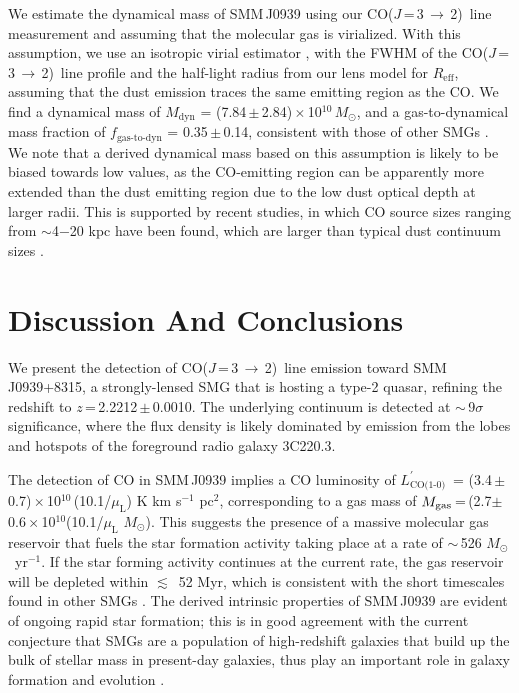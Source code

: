 \documentclass[iop, revtex4]{emulateapj}
\newcommand{\Msun}{\mbox{$M_{\odot}$}}
\newcommand{\CO}{\mbox{CO($J$\,=\,3\,$\rightarrow$\,2) }}
\newcommand{\Lp}{\mbox{$L^{\prime}_\textrm{CO(1-0)}$}}
\newcommand{\LpU}{\mbox{K\,\,km\,\,s$^{-1}$\,\,pc$^2$}}
\newcommand{\eg}{{\sl e.g.,~}}
\newcommand{\pmOne}{\mbox{$^{-1}$}}
\begin{document}
We estimate the dynamical mass of SMM\,J0939 using our \CO line measurement and assuming that the molecular gas is virialized. With this assumption, we use an isotropic virial estimator \citep[\eg][]{Engel10a}, with the FWHM of the \CO line profile and the half-light radius from our lens model for $R_\textrm{eff}$, assuming that the dust emission traces the same emitting region as the CO.
We find a dynamical mass of $M_\textrm{dyn}$ = (7.84\,$\pm$\,2.84)\,$\times$\,10$^{10}$\,\Msun, and a gas-to-dynamical mass fraction of $f_\textrm{gas-to-dyn}$ = 0.35\,$\pm$\,0.14, consistent with those of other SMGs \citep{Tacconi06a}.  We note that a derived dynamical mass based on this assumption is likely to be biased towards low values, as the CO-emitting region can be apparently more extended than the dust emitting region
 due to the low dust optical depth at larger radii.
This is supported by recent studies, in which CO source sizes ranging from $\sim$4$-$20 kpc have been found, which are larger than typical dust continuum sizes \citep{Tacconi06a, Riechers11c, Ivison11a, Hodge13a, Hodge15a}.

\section{Discussion And Conclusions}
We present the detection of \CO line emission toward SMM\,J0939+8315, a strongly-lensed SMG that is hosting a type-2 quasar, refining the redshift
to $z$\,=\,2.2212\,$\pm$\,0.0010. The underlying continuum is detected at $\sim$\,9$\sigma$ significance, where the flux density is likely dominated by emission from the lobes and hotspots of the foreground radio galaxy 3C220.3.

The detection of CO in SMM\,J0939
implies a CO luminosity of \Lp\ = (3.4\,$\pm$\,0.7)\,$\times$\,10$^{10}$\,(10.1/$\mu_\textrm{L}$) \LpU, corresponding to a gas mass of
$M_{\rm gas}$\,=\,(2.7$\pm$0.6\,$\times$\,10$^{10}$(10.1/$\mu_\textrm{L}$ $\Msun$).
This 
suggests the presence of a massive
molecular gas reservoir that fuels the star formation activity taking place at a rate of $\sim$\,526 \Msun~yr\pmOne. If the star forming activity continues at the current rate, the gas reservoir will be depleted within $\lesssim$~52 Myr,
which is consistent with the short timescales found in other SMGs \citep{Greve05a}. The derived intrinsic properties of SMM\,J0939 are evident of ongoing rapid star formation; this is in good agreement with the current conjecture that SMGs are a
population of high-redshift galaxies that build up the bulk of stellar mass in present-day galaxies, thus play an important role
in galaxy formation and evolution \citep[\eg ][]{Dickinson03a}.
\end{document}

